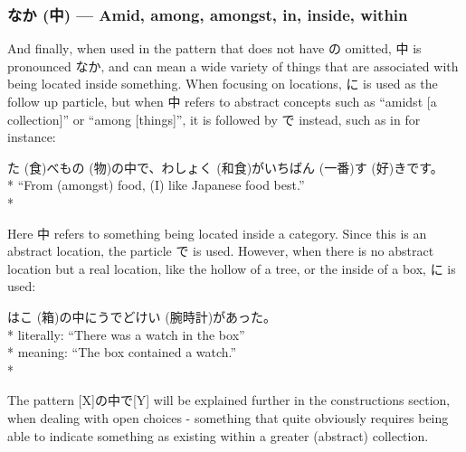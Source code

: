 \documentclass[11pt, b5paper, twoside, openright, onecolumn]{book}
\makeatletter
\newcommand*{\rubystack}[2]{{\relscale{0.5}%
  \begin{tabular}[b]{@{}c@{}}%
    {#1}\\%
   {\textscale{2}{#2}}%
  \end{tabular}}%
}
\DeclareRobustCommand*{\ruby}[2]{%
  \mbox{%
    \setlength{\parskip}{0ex}%
    \BeginAccSupp{method=pdfstringdef,ActualText={#1}}%
      \rubystack{\phantom{#2}}{#1}%
      \llap{%
        \rubystack{#2}{\phantom{#1}}%
      }%
    \EndAccSupp{}%
  }%
}
\renewcommand*{\ruby}[2]{#2 (#1)}%
\newenvironment{exampleblock}{
\setlength{\parindent}{0.6in}
\begin{minipage}[t]{\dimexpr\textwidth-\parindent}}
{\end{minipage}}
\makeatother
\begin{document}
\subsubsection{\ruby{中}{なか} — Amid‚ among‚ amongst‚ in‚ inside‚ within}


And finally‚ when used in the pattern that does not have の omitted‚ 中 is pronounced なか‚ and can mean a wide variety of things that are associated with being located inside something. When focusing on locations‚ に is used as the follow up particle‚ but when 中 refers to abstract concepts such as “amidst [a collection]” or “among [things]”‚ it is followed by で instead‚ such as in for instance:

\vspace{0.4cm}
\begin{exampleblock}
\ruby{食}{た}べ\ruby{物}{もの}の中で、\ruby{和食}{わしょく}が\ruby{一番}{いちばん}\ruby{好}{す}きです。 \\* 
“From (amongst) food‚ (I) like Japanese food best.” \\* 
\end{exampleblock}
\vspace{0.2cm}

Here 中 refers to something being located inside a category. Since this is an abstract location‚ the particle で is used. However‚ when there is no abstract location but a real location‚ like the hollow of a tree‚ or the inside of a box‚ に is used:

\vspace{0.4cm}
\begin{exampleblock}
\ruby{箱}{はこ}の中に\ruby{腕時計}{うでどけい}があった。 \\* 
literally: “There was a watch in the box” \\* 
meaning: “The box contained a watch.” \\* 
\end{exampleblock}
\vspace{0.2cm}

The pattern [X]の中で[Y] will be explained further in the constructions section‚ when dealing with open choices - something that quite obviously requires being able to indicate something as existing within a greater (abstract) collection.
\end{document}

